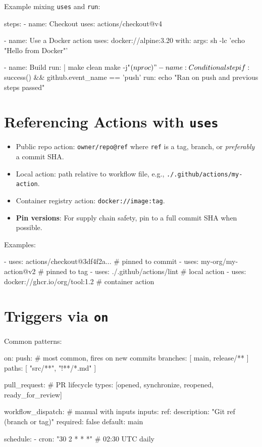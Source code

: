 \documentclass[11pt]{article}
\begin{document}
\noindent Example mixing \texttt{uses} and \texttt{run}:
\begin{yamlcode}
steps:
  - name: Checkout
    uses: actions/checkout@v4

  - name: Use a Docker action
    uses: docker://alpine:3.20
    with:
      args: sh -lc 'echo "Hello from Docker"'

  - name: Build
    run: |
      make clean
      make -j"$(nproc)"

  - name: Conditional step
    if: ${{ success() && github.event_name == 'push' }}
    run: echo "Ran on push and previous steps passed"
\end{yamlcode}

\section{Referencing Actions with \texttt{uses}}
\begin{itemize}
  \item Public repo action: \texttt{owner/repo@ref} where \texttt{ref} is a tag, branch, or \emph{preferably} a commit SHA.
  \item Local action: path relative to workflow file, e.g., \texttt{./.github/actions/my-action}.
  \item Container registry action: \texttt{docker://image:tag}.
  \item \textbf{Pin versions}: For supply chain safety, pin to a full commit SHA when possible.
\end{itemize}

\noindent Examples:
\begin{yamlcode}
- uses: actions/checkout@3df4f2a...   # pinned to commit
- uses: my-org/my-action@v2           # pinned to tag
- uses: ./.github/actions/lint        # local action
- uses: docker://ghcr.io/org/tool:1.2 # container action
\end{yamlcode}
\clearpage

\section{Triggers via \texttt{on}}
Common patterns:
\begin{yamlcode}
on:
  push:            # most common, fires on new commits
    branches: [ main, release/** ]
    paths: [ "src/**", "!**/*.md" ]

  pull_request:    # PR lifecycle
    types: [opened, synchronize, reopened, ready_for_review]

  workflow_dispatch:  # manual with inputs
    inputs:
      ref:
        description: "Git ref (branch or tag)"
        required: false
        default: main

  schedule:
    - cron: "30 2 * * *" # 02:30 UTC daily
\end{yamlcode}
\end{document}
